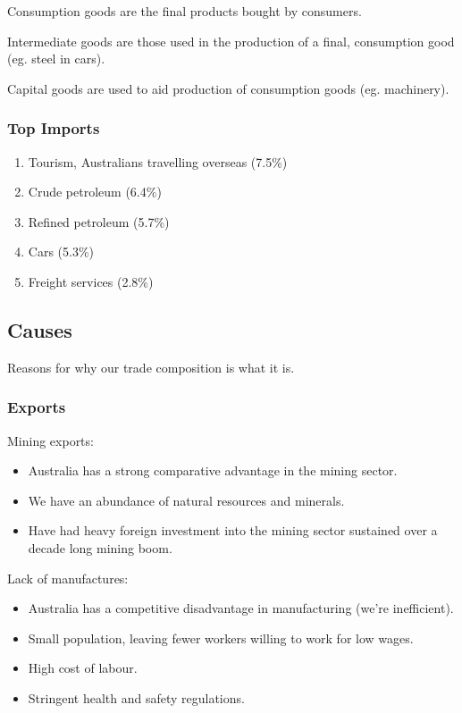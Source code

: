 \documentclass[a4paper,11pt]{article}
\begin{document}
Consumption goods are the final products bought by consumers.

Intermediate goods are those used in the production of a final, consumption
good (eg. steel in cars).

Capital goods are used to aid production of consumption goods (eg. machinery).


\subsubsection{Top Imports}

\begin{enumerate}
\item Tourism, Australians travelling overseas (7.5\%)
\item Crude petroleum (6.4\%)
\item Refined petroleum (5.7\%)
\item Cars (5.3\%)
\item Freight services (2.8\%)
\end{enumerate}


\subsection{Causes}

Reasons for why our trade composition is what it is.

\subsubsection{Exports}

Mining exports:

\begin{itemize}
\item Australia has a strong comparative advantage in the mining sector.
\item We have an abundance of natural resources and minerals.
\item Have had heavy foreign investment into the mining sector sustained over
	a decade long mining boom.
\end{itemize}

Lack of manufactures:

\begin{itemize}
\item Australia has a competitive disadvantage in manufacturing (we're
	inefficient).
\item Small population, leaving fewer workers willing to work for low wages.
\item High cost of labour.
\item Stringent health and safety regulations.
\end{itemize}
\end{document}
